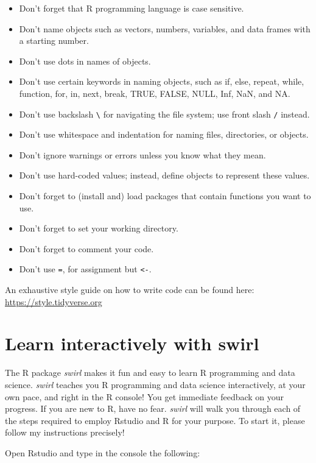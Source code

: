 \documentclass[
  12pt,
  oneside]{book}
\providecommand{\tightlist}{%
  \setlength{\itemsep}{0pt}\setlength{\parskip}{0pt}}
\theoremstyle{definition}
\theoremstyle{definition}
\theoremstyle{definition}
\theoremstyle{definition}
\theoremstyle{remark}
\begin{document}
\begin{itemize}
\tightlist
\item
  Don't forget that R programming language is case sensitive.
\item
  Don't name objects such as vectors, numbers, variables, and data frames with a starting number.
\item
  Don't use dots in names of objects.
\item
  Don't use certain keywords in naming objects, such as if, else, repeat, while, function, for, in, next, break, TRUE, FALSE, NULL, Inf, NaN, and NA.
\item
  Don't use backslash \texttt{\textbackslash{}} for navigating the file system; use front slash \texttt{/} instead.
\item
  Don't use whitespace and indentation for naming files, directories, or objects.
\item
  Don't ignore warnings or errors unless you know what they mean.
\item
  Don't use hard-coded values; instead, define objects to represent these values.
\item
  Don't forget to (install and) load packages that contain functions you want to use.
\item
  Don't forget to set your working directory.
\item
  Don't forget to comment your code.
\item
  Don't use \texttt{=}, for assignment but \texttt{\textless{}-}.
\end{itemize}

An exhaustive style guide on how to write code can be found here: \url{https://style.tidyverse.org}

\hypertarget{swirl}{%
\chapter{Learn interactively with swirl}\label{swirl}}

The R package \emph{swirl} makes it fun and easy to learn R programming and data science.
\emph{swirl} teaches you R programming and data science interactively, at your own pace,
and right in the R console! You get immediate feedback on your progress.
If you are new to R, have no fear. \emph{swirl} will walk you through each of the steps
required to employ Rstudio and R for your purpose.
To start it, please follow my instructions precisely!

Open Rstudio and type in the console the following:
\end{document}
